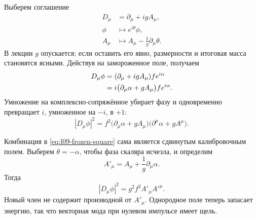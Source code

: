 Выберем соглашение
\begin{equation}
\begin{aligned}
  D_\mu&=\partial_\mu+igA_\mu,
  \\
  \phi&\longmapsto e^{i\theta}\phi,
  \\
  A_\mu&\longmapsto A_\mu-\frac1g\partial_\mu\theta .
\end{aligned}
  \label{eq:l09-gauge-convention}
\end{equation}
В лекции \(g\) опускается; если оставить его явно, размерности и итоговая масса становятся ясными. Действуя на замороженное поле, получаем
\begin{align}
  D_\mu\phi
  &=(\partial_\mu+igA_\mu)f e^{i\alpha}
  \notag\\
  &=i\bigl(\partial_\mu\alpha+gA_\mu\bigr)
    f e^{i\alpha}.
  \label{eq:l09-covariant-frozen}
\end{align}
Умножение на комплексно-сопряжённое убирает фазу и одновременно превращает \(i\), умноженное на \(-i\), в \(+1\):
\begin{equation}
  |D_\mu\phi|^2
  =f^2
   \bigl(\partial_\mu\alpha+gA_\mu\bigr)
   \bigl(\partial^\mu\alpha+gA^\mu\bigr).
  \label{eq:l09-frozen-square}
\end{equation}

\begin{classroomqa}
\end{classroomqa}

Комбинация в \eqref{eq:l09-frozen-square} сама является сдвинутым калибровочным полем. Выберем \(\theta=-\alpha\), чтобы фаза скаляра исчезла, и определим
\begin{equation}
  A'_\mu=A_\mu+\frac1g\partial_\mu\alpha .
  \label{eq:l09-unitary-gauge-field}
\end{equation}
Тогда
\begin{equation}
  |D_\mu\phi|^2=g^2f^2 A'_\mu A'^\mu .
  \label{eq:l09-vector-mass-term}
\end{equation}
Новый член не содержит производной от \(A'_\mu\). Однородное поле теперь запасает энергию, так что векторная мода при нулевом импульсе имеет щель.

